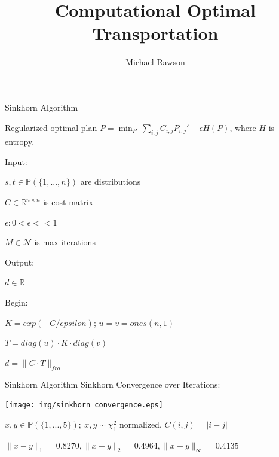 \documentclass[10pt]{beamer}
\title[Computational Optimal Transportation]
{Computational Optimal Transportation}
\author[Michael Rawson]{
Michael Rawson}
\newcommand{\R}{{\mathbb{R}}}
\newcommand{\PP}{{\mathbb{P}}}
\newcommand{\1}{{\mathbbm{1}}}
\begin{document}
\begin{frame}

    \titlepage 

\end{frame}

\begin{frame}{Sinkhorn Algorithm}

Regularized optimal plan $ P = \min_{P'} \sum_{i,j} C_{i,j} P_{i,j}' - \epsilon H(P) $, where $H$ is entropy. \pause

\begin{algorithm}[H]
    Input: 
    
    \quad $s,t \in\PP(\{1,...,n\})$ are distributions
    
    \quad $C\in\R^{n \times n}$ is cost matrix
    
    \quad $\epsilon: 0<\epsilon<<1$
    
    \quad $M \in \mathcal{N}$ is max iterations \pause
    
    Output:
    
    \quad $d \in \R$ \pause

    Begin:
    
    $K = exp(-C/epsilon)$;
    $u = v = ones(n,1)$

    $T = diag(u) \cdot K \cdot diag(v)$

    
    $d = \|C \cdot T\|_{fro}$
  	
	\caption{Sinkhorn Algorithm}
\end{algorithm}

\end{frame}

\begin{frame}{Sinkhorn Algorithm}
\pause
Sinkhorn Convergence over Iterations: \pause

\begin{center}
    
\texttt{[image: img/sinkhorn\_convergence.eps]} \pause

$ x,y\in\PP(\{1,...,5\});\ x,y \sim \chi^2_1 $ normalized, $C(i,j)=|i-j|$ \pause


$ \|x-y\|_1=0.8270, \|x-y\|_2=0.4964, \|x-y\|_{\infty}=0.4135 $

\end{center}

\end{frame}
\end{document}
